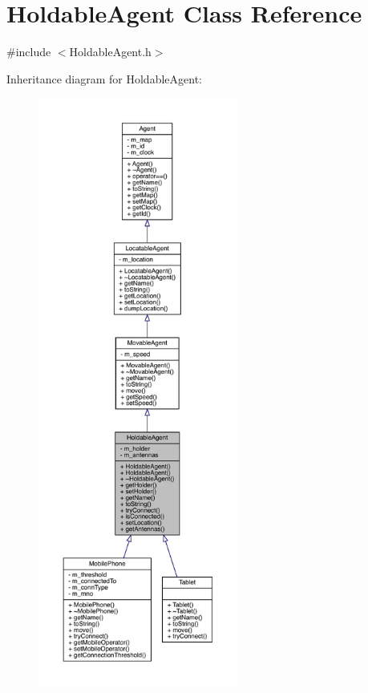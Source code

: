 \hypertarget{class_holdable_agent}{}\section{Holdable\+Agent Class Reference}
\label{class_holdable_agent}


{\ttfamily \#include $<$Holdable\+Agent.\+h$>$}



Inheritance diagram for Holdable\+Agent\+:
\nopagebreak
\begin{figure}[H]
\begin{center}
\leavevmode
\includegraphics[height=550pt]{class_holdable_agent__inherit__graph}
\end{center}
\end{figure}


